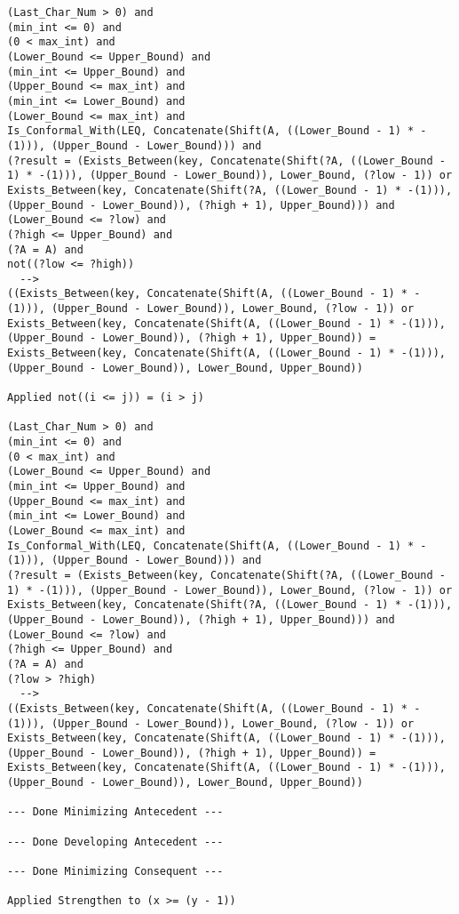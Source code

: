 \begin{lstlisting}[language=resolve]
(Last_Char_Num > 0) and
(min_int <= 0) and
(0 < max_int) and
(Lower_Bound <= Upper_Bound) and
(min_int <= Upper_Bound) and
(Upper_Bound <= max_int) and
(min_int <= Lower_Bound) and
(Lower_Bound <= max_int) and
Is_Conformal_With(LEQ, Concatenate(Shift(A, ((Lower_Bound - 1) * -(1))), (Upper_Bound - Lower_Bound))) and
(?result = (Exists_Between(key, Concatenate(Shift(?A, ((Lower_Bound - 1) * -(1))), (Upper_Bound - Lower_Bound)), Lower_Bound, (?low - 1)) or Exists_Between(key, Concatenate(Shift(?A, ((Lower_Bound - 1) * -(1))), (Upper_Bound - Lower_Bound)), (?high + 1), Upper_Bound))) and
(Lower_Bound <= ?low) and
(?high <= Upper_Bound) and
(?A = A) and
not((?low <= ?high))
  -->
((Exists_Between(key, Concatenate(Shift(A, ((Lower_Bound - 1) * -(1))), (Upper_Bound - Lower_Bound)), Lower_Bound, (?low - 1)) or Exists_Between(key, Concatenate(Shift(A, ((Lower_Bound - 1) * -(1))), (Upper_Bound - Lower_Bound)), (?high + 1), Upper_Bound)) = Exists_Between(key, Concatenate(Shift(A, ((Lower_Bound - 1) * -(1))), (Upper_Bound - Lower_Bound)), Lower_Bound, Upper_Bound))

Applied not((i <= j)) = (i > j)

(Last_Char_Num > 0) and
(min_int <= 0) and
(0 < max_int) and
(Lower_Bound <= Upper_Bound) and
(min_int <= Upper_Bound) and
(Upper_Bound <= max_int) and
(min_int <= Lower_Bound) and
(Lower_Bound <= max_int) and
Is_Conformal_With(LEQ, Concatenate(Shift(A, ((Lower_Bound - 1) * -(1))), (Upper_Bound - Lower_Bound))) and
(?result = (Exists_Between(key, Concatenate(Shift(?A, ((Lower_Bound - 1) * -(1))), (Upper_Bound - Lower_Bound)), Lower_Bound, (?low - 1)) or Exists_Between(key, Concatenate(Shift(?A, ((Lower_Bound - 1) * -(1))), (Upper_Bound - Lower_Bound)), (?high + 1), Upper_Bound))) and
(Lower_Bound <= ?low) and
(?high <= Upper_Bound) and
(?A = A) and
(?low > ?high)
  -->
((Exists_Between(key, Concatenate(Shift(A, ((Lower_Bound - 1) * -(1))), (Upper_Bound - Lower_Bound)), Lower_Bound, (?low - 1)) or Exists_Between(key, Concatenate(Shift(A, ((Lower_Bound - 1) * -(1))), (Upper_Bound - Lower_Bound)), (?high + 1), Upper_Bound)) = Exists_Between(key, Concatenate(Shift(A, ((Lower_Bound - 1) * -(1))), (Upper_Bound - Lower_Bound)), Lower_Bound, Upper_Bound))

--- Done Minimizing Antecedent ---

--- Done Developing Antecedent ---

--- Done Minimizing Consequent ---

Applied Strengthen to (x >= (y - 1))


\end{lstlisting}
